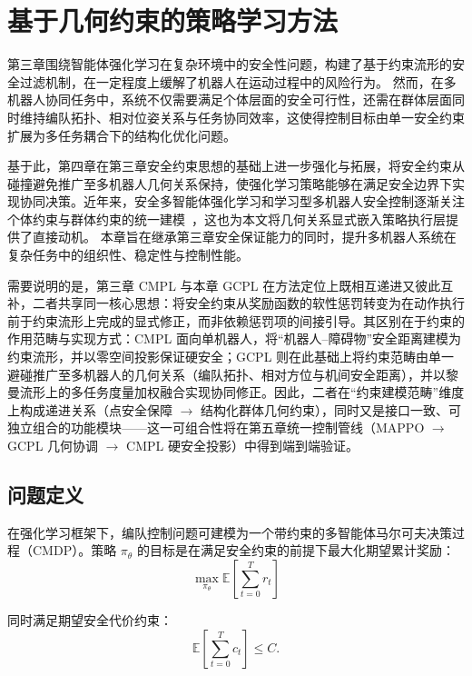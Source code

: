 \chapter{基于几何约束的策略学习方法}
第三章围绕智能体强化学习在复杂环境中的安全性问题，构建了基于约束流形的安全过滤机制，在一定程度上缓解了机器人在运动过程中的风险行为。
然而，在多机器人协同任务中，系统不仅需要满足个体层面的安全可行性，还需在群体层面同时维持编队拓扑、相对位姿关系与任务协同效率，这使得控制目标由单一安全约束扩展为多任务耦合下的结构化优化问题。

基于此，第四章在第三章安全约束思想的基础上进一步强化与拓展，将安全约束从碰撞避免推广至多机器人几何关系保持，使强化学习策略能够在满足安全边界下实现协同决策。近年来，安全多智能体强化学习和学习型多机器人安全控制逐渐关注个体约束与群体约束的统一建模~\cite{gu2023safe,garg2024learning,li2025coordinating,orr2023marl_multirobot_survey}，这也为本文将几何关系显式嵌入策略执行层提供了直接动机。
本章旨在继承第三章安全保证能力的同时，提升多机器人系统在复杂任务中的组织性、稳定性与控制性能。

需要说明的是，第三章 CMPL 与本章 GCPL 在方法定位上既相互递进又彼此互补，二者共享同一核心思想：将安全约束从奖励函数的软性惩罚转变为在动作执行前于约束流形上完成的显式修正，而非依赖惩罚项的间接引导。其区别在于约束的作用范畴与实现方式：CMPL 面向单机器人，将“机器人–障碍物”安全距离建模为约束流形，并以零空间投影保证硬安全；GCPL 则在此基础上将约束范畴由单一避碰推广至多机器人的几何关系（编队拓扑、相对方位与机间安全距离），并以黎曼流形上的多任务度量加权融合实现协同修正。因此，二者在“约束建模范畴”维度上构成递进关系（点安全保障 $\rightarrow$ 结构化群体几何约束），同时又是接口一致、可独立组合的功能模块——这一可组合性将在第五章统一控制管线（MAPPO $\rightarrow$ GCPL 几何协调 $\rightarrow$ CMPL 硬安全投影）中得到端到端验证。

\section{问题定义}
在强化学习框架下，编队控制问题可建模为一个带约束的多智能体马尔可夫决策过程（CMDP）。策略 $\pi_\theta$ 的目标是在满足安全约束的前提下最大化期望累计奖励：
\begin{equation}
\max_{\pi_\theta} \mathbb{E}\left[\sum_{t=0}^{T} r_t \right]
\end{equation}

同时满足期望安全代价约束：
\begin{equation}
\mathbb{E}\left[\sum_{t=0}^{T} c_t \right] \le C.
\end{equation}

